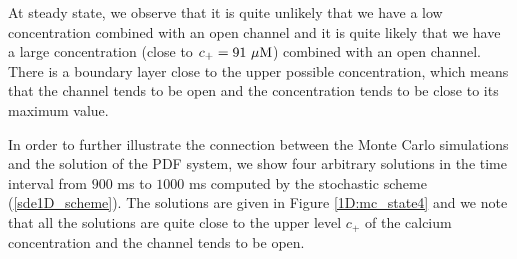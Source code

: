 At steady state, we observe that it is quite unlikely that we have a low concentration combined with an open channel and it is quite likely that we have a large concentration (close to $c_+=91\text{ }\rm{\mu M}$) combined with an open channel. There is a boundary layer close to the upper possible concentration, which means that the channel tends to be open and the concentration tends to be close to its maximum value. 

In order to further illustrate the connection between the Monte Carlo simulations and the solution of the PDF system, we show four arbitrary solutions in the time interval from $900$ ms to $1000$ ms computed by the stochastic scheme (\ref{sde1D_scheme}). The solutions are given in Figure \ref{1D:mc_state4} and we note that all the solutions are quite close to the upper level $c_+$ of the calcium concentration and the channel tends to be open. 

